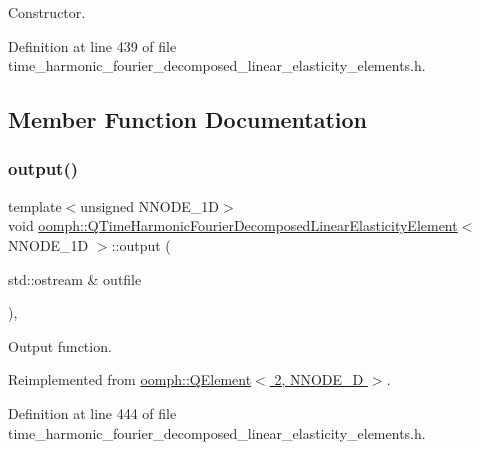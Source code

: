 Constructor. 



Definition at line 439 of file time\+\_\+harmonic\+\_\+fourier\+\_\+decomposed\+\_\+linear\+\_\+elasticity\+\_\+elements.\+h.



\subsection{Member Function Documentation}
\mbox{\label{classoomph_1_1QTimeHarmonicFourierDecomposedLinearElasticityElement_a8d2c88dba3a246693ba43bab9d84fbd8}} 
\subsubsection{\texorpdfstring{output()}{output()}\hspace{0.1cm}{\footnotesize\ttfamily [1/4]}}
{\footnotesize\ttfamily template$<$unsigned N\+N\+O\+D\+E\+\_\+1D$>$ \\
void \hyperlink{classoomph_1_1QTimeHarmonicFourierDecomposedLinearElasticityElement}{oomph\+::\+Q\+Time\+Harmonic\+Fourier\+Decomposed\+Linear\+Elasticity\+Element}$<$ N\+N\+O\+D\+E\+\_\+1D $>$\+::output (\begin{DoxyParamCaption}\item[{std\+::ostream \&}]{outfile }\end{DoxyParamCaption})\hspace{0.3cm}{\ttfamily [inline]}, {\ttfamily [virtual]}}



Output function. 



Reimplemented from \hyperlink{classoomph_1_1QElement_3_012_00_01NNODE__1D_01_4_ab7bb815a43598e7ce0c4d10c511504fc}{oomph\+::\+Q\+Element$<$ 2, N\+N\+O\+D\+E\+\_\+D $>$}.



Definition at line 444 of file time\+\_\+harmonic\+\_\+fourier\+\_\+decomposed\+\_\+linear\+\_\+elasticity\+\_\+elements.\+h.



